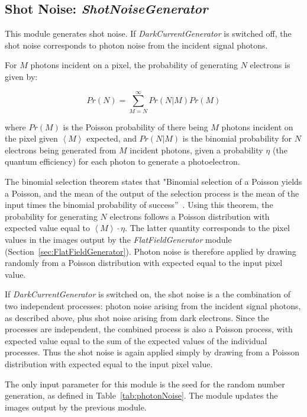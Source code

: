 \documentclass[11pt]{article}      %
\begin{document}
\subsection{Shot Noise:  {\it ShotNoiseGenerator}}
\label{sec:PhotonNoiseGenerator}

This module generates shot noise. If {\em DarkCurrentGenerator} is switched off, the shot noise corresponds to photon noise from the incident signal photons.

For $M$ photons incident on a pixel, the probability of generating $N$ electrons is given by:

$$Pr(N)=\sum_{M=N}^{\infty} Pr(N|M)Pr(M)$$

where $Pr(M)$ is the Poisson probability of there being $M$ photons incident on the pixel given $\left< M\right>$ expected, and $Pr(N|M)$ is the binomial probability for $N$ electrons being generated from $M$ incident photons, given a probability $\eta$ (the quantum efficiency) for each photon to generate a photoelectron. 

The binomial selection theorem states that "Binomial selection of a Poisson yields a Poisson, and the mean of the output of the selection process is the mean of the input times the binomial probability of success''~\cite{binomialSelectionTheorem}. Using this theorem, the probability for generating $N$ electrons follows a Poisson distribution with expected value equal to $\left< M\right>\cdot\eta$. The latter quantity corresponds to the pixel values in the images output by the {\it FlatFieldGenerator} module (Section~\ref{sec:FlatFieldGenerator}). Photon noise is therefore applied by drawing randomly from a Poisson distribution with expected equal to the input pixel value.

If {\em DarkCurrentGenerator} is switched on, the shot noise is a the combination of two independent processes: photon noise arising from the incident signal photons, as described above, plus shot noise arising from dark electrons. Since the processes are independent, the combined process is also a Poisson process, with expected value equal to the sum of the expected values of the individual processes. Thus the shot noise is again applied simply by drawing from a Poisson distribution with expected equal to the input pixel value.

The only input parameter for this module is the seed for the random number generation, as defined in Table~\ref{tab:photonNoise}. The module updates the images output by the previous module.
\end{document}
